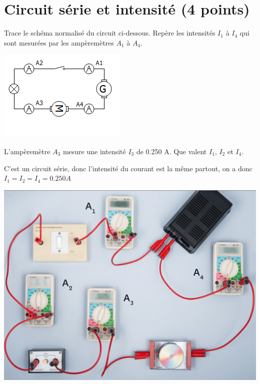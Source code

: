 \section{Circuit série et intensité (4 points)}

\begin{questions}
	\question Trace le schéma normalisé du circuit ci-dessous. Repère les intensités $I_1$ à $I_4$ qui sont mesurées par les ampèremètres $A_1$ à $A_4$.
	\begin{solution}
		\begin{center}
			\includegraphics[scale=1.1]{img/ex4_exam}
		\end{center}
	\end{solution}
	
	
	\question L'ampèremètre $A_3$ mesure une intensité $I_3$ de \num{0.250} A. Que valent $I_1$, $I_2$ et $I_4$.
	\begin{solution}
		C'est un circuit série, donc l'intensité du courant est la même partout, on a donc $I_1 = I_2 =I_4 = \num{0.250} A$
	\end{solution}
\end{questions}

\begin{center}
	\includegraphics[scale=0.4]{img/ex15}
\end{center}